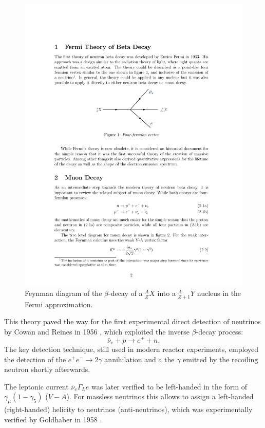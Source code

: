 \begin{figure}
    \centering
    \includegraphics[width=0.7\linewidth]{figures/fermidecay.pdf}
    \caption{Feynman diagram of the $\beta$-decay of a $^{A}_{Z}X$ into a $^{A}_{Z+1}Y$ nucleus in the Fermi approximation.}
    \label{fig:fermibeta}
\end{figure}

This theory paved the way for the first experimental direct detection of neutrinos by Cowan and Reines in 1956 \cite{Cowan:1992xc}, which exploited the inverse $\beta$-decay process:
\begin{equation}
    \bar{\nu}_{e} + p \rightarrow e^{+} + n.
\end{equation}
The key detection technique, still used in modern reactor experiments, employed the detection of the $e^{+}e^{-}\rightarrow 2\gamma$ annihilation and a the $\gamma$ emitted by the recoiling neutron shortly afterwards. 

The leptonic current $\bar{\nu}_{e}\Gamma_{L}e$ was later verified to be left-handed in the form of $\gamma_{\mu}(1-\gamma_{5})$ ($V-A$). 
For massless neutrinos this allows to assign a left-handed (right-handed) helicity to neutrinos (anti-neutrinos), which was experimentally verified by Goldhaber in 1958 \cite{Goldhaber:1958nb}.

